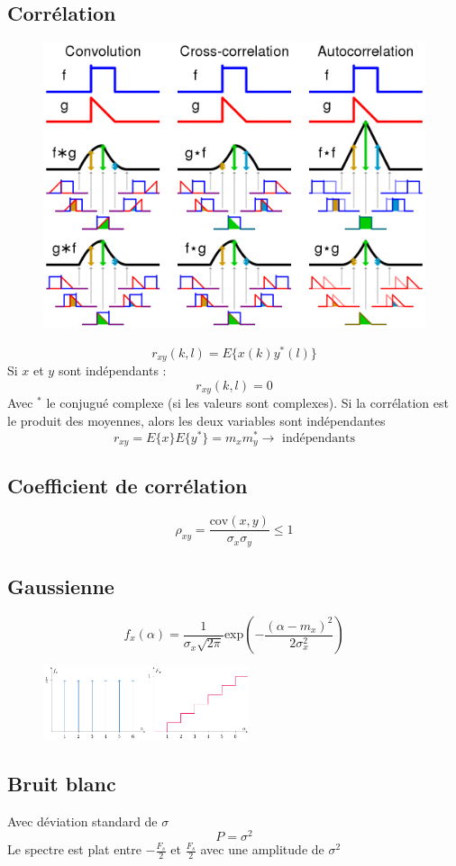 \documentclass[resume]{subfiles}
\begin{document}
\subsection{Corrélation}
\begin{figure}[H]
\centering
\includegraphics[width=\columnwidth]{img_3.png}
\end{figure}
$$r_{xy}(k,l)=E\lbrace x(k)y^\ast(l)\rbrace$$
Si $x$ et $y$ sont indépendants :
$$r_{xy}(k,l)=0$$
Avec ${}^\ast$ le conjugué complexe (si les valeurs sont complexes). Si la corrélation est le produit des moyennes, alors les deux variables sont indépendantes
$$r_{xy}=E\lbrace x\rbrace E\lbrace y^\ast\rbrace=m_xm_y^\ast\longrightarrow\text{ indépendants}$$
\subsection{Coefficient de corrélation}
$$\rho_{xy}=\frac{\text{cov}(x,y)}{\sigma_x\sigma_y}\leq 1$$
\subsection{Gaussienne}
$$f_x(\alpha)=\frac{1}{\sigma_x\sqrt{2\pi}}\text{exp}\left(-\frac{(\alpha-m_x)^2}{2\sigma_x^2}\right)$$
\begin{figure}[H]
\centering
\includegraphics[width=6cm ,page=3]{drwg_3.pdf}
\end{figure}
\subsection{Bruit blanc}
Avec déviation standard de $\sigma$
$$P=\sigma^2$$
Le spectre est plat entre $-\frac{F_s}{2}$ et $\frac{F_s}{2}$ avec une amplitude de $\sigma^2$
\end{document}
